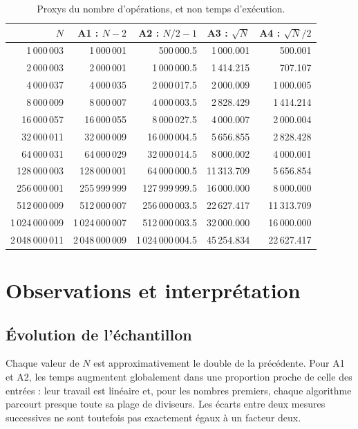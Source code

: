 \documentclass[11pt,a4paper]{article}
\begin{document}
\begin{table}[H]
\centering
\small
\begin{tabular}{r r r r r}
\toprule
$N$ & A1 : $N-2$ & A2 : $N/2-1$ & A3 : $\sqrt{N}$ & A4 : $\sqrt{N}/2$ \\
\midrule
1\,000\,003 & 1\,000\,001 & 500\,000.5 & 1\,000.001 & 500.001 \\
2\,000\,003 & 2\,000\,001 & 1\,000\,000.5 & 1\,414.215 & 707.107 \\
4\,000\,037 & 4\,000\,035 & 2\,000\,017.5 & 2\,000.009 & 1\,000.005 \\
8\,000\,009 & 8\,000\,007 & 4\,000\,003.5 & 2\,828.429 & 1\,414.214 \\
16\,000\,057 & 16\,000\,055 & 8\,000\,027.5 & 4\,000.007 & 2\,000.004 \\
32\,000\,011 & 32\,000\,009 & 16\,000\,004.5 & 5\,656.855 & 2\,828.428 \\
64\,000\,031 & 64\,000\,029 & 32\,000\,014.5 & 8\,000.002 & 4\,000.001 \\
128\,000\,003 & 128\,000\,001 & 64\,000\,000.5 & 11\,313.709 & 5\,656.854 \\
256\,000\,001 & 255\,999\,999 & 127\,999\,999.5 & 16\,000.000 & 8\,000.000 \\
512\,000\,009 & 512\,000\,007 & 256\,000\,003.5 & 22\,627.417 & 11\,313.709 \\
1\,024\,000\,009 & 1\,024\,000\,007 & 512\,000\,003.5 & 32\,000.000 & 16\,000.000 \\
2\,048\,000\,011 & 2\,048\,000\,009 & 1\,024\,000\,004.5 & 45\,254.834 & 22\,627.417 \\
\bottomrule
\end{tabular}
\caption{Proxys du nombre d'opérations, et non temps d'exécution.}
\label{tab:theorie}
\end{table}

\section{Observations et interprétation}

\subsection{Évolution de l'échantillon}

Chaque valeur de $N$ est approximativement le double de la précédente. Pour A1 et A2, les temps augmentent globalement dans une proportion proche de celle des entrées : leur travail est linéaire et, pour les nombres premiers, chaque algorithme parcourt presque toute sa plage de diviseurs. Les écarts entre deux mesures successives ne sont toutefois pas exactement égaux à un facteur deux.
\end{document}
